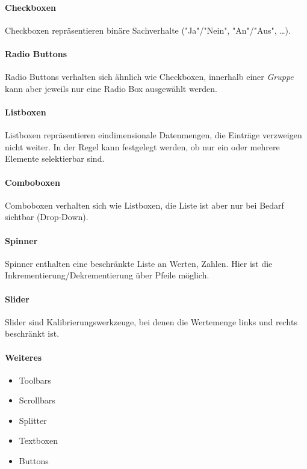 				\paragraph{Checkboxen}
					Checkboxen repräsentieren binäre Sachverhalte ("Ja"/"Nein", "An"/"Aus", \dots).

				\paragraph{Radio Buttons}
					Radio Buttons verhalten sich ähnlich wie Checkboxen, innerhalb einer \emph{Gruppe} kann aber jeweils nur eine Radio Box ausgewählt werden.

				\paragraph{Listboxen}
					Listboxen repräsentieren eindimensionale Datenmengen, \dh die Einträge verzweigen nicht weiter. In der Regel kann festgelegt werden, ob nur ein oder mehrere Elemente selektierbar sind.

				\paragraph{Comboboxen}
					Comboboxen verhalten sich wie Listboxen, die Liste ist aber nur bei Bedarf sichtbar (Drop-Down).

				\paragraph{Spinner}
					Spinner enthalten eine beschränkte Liste an Werten, \zB Zahlen. Hier ist die Inkrementierung/Dekrementierung über Pfeile möglich.

				\paragraph{Slider}
					Slider sind Kalibrierungswerkzeuge, bei denen die Wertemenge links und rechts beschränkt ist.

				\paragraph{Weiteres}
					\begin{itemize}
						\item Toolbars
						\item Scrollbars
						\item Splitter
						\item Textboxen
						\item Buttons
					\end{itemize}

